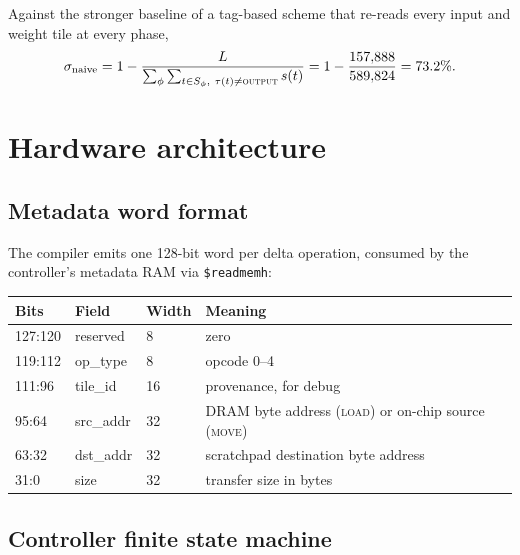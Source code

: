 \documentclass[11pt,a4paper]{article}
\newcommand{\op}[1]{\textsc{#1}}
\begin{document}
Against the stronger baseline of a tag-based scheme that re-reads every input
and weight tile at every phase,
\begin{equation}
  \sigma_{\text{naive}} = 1 - \frac{L}{\sum_{\phi}\sum_{t \in S_\phi,\ \tau(t)\ne\textsc{output}} s(t)}
  = 1 - \frac{157{,}888}{589{,}824} = 73.2\% .
\end{equation}

\section{Hardware architecture}

\subsection{Metadata word format}

The compiler emits one 128-bit word per delta operation, consumed by the
controller's metadata RAM via \texttt{\$readmemh}:

\begin{center}
\small
\begin{tabular}{@{}llll@{}}
\toprule
\textbf{Bits} & \textbf{Field} & \textbf{Width} & \textbf{Meaning} \\
\midrule
127:120 & reserved  & 8  & zero \\
119:112 & op\_type  & 8  & opcode 0--4 \\
111:96  & tile\_id  & 16 & provenance, for debug \\
95:64   & src\_addr & 32 & DRAM byte address (\op{load}) or on-chip source (\op{move}) \\
63:32   & dst\_addr & 32 & scratchpad destination byte address \\
31:0    & size      & 32 & transfer size in bytes \\
\bottomrule
\end{tabular}
\end{center}

\subsection{Controller finite state machine}
\end{document}
